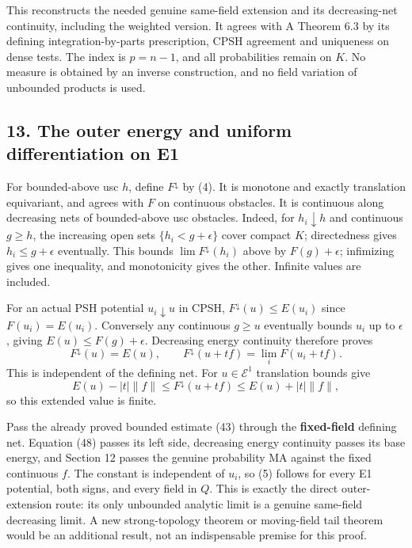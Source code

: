 \documentclass[
  10pt,
]{article}
\begin{document}
This reconstructs the needed genuine same-field extension and its
decreasing-net continuity, including the weighted version. It agrees
with A Theorem 6.3 by its defining integration-by-parts prescription,
CPSH agreement and uniqueness on dense tests. The index is \(p=n-1\),
and all probabilities remain on \(K\). No measure is obtained by an
inverse construction, and no field variation of unbounded products is
used.

\subsection{13. The outer energy and uniform differentiation on
E1}\label{the-outer-energy-and-uniform-differentiation-on-e1}

For bounded-above usc \(h\), define \(F^\downarrow\) by (4). It is
monotone and exactly translation equivariant, and agrees with \(F\) on
continuous obstacles. It is continuous along decreasing nets of
bounded-above usc obstacles. Indeed, for \(h_i\downarrow h\) and
continuous \(g\geq h\), the increasing open sets \(\{h_i<g+\epsilon\}\)
cover compact \(K\); directedness gives \(h_i\leq g+\epsilon\)
eventually. This bounds \(\lim F^\downarrow(h_i)\) above by
\(F(g)+\epsilon\); infimizing gives one inequality, and monotonicity
gives the other. Infinite values are included.

For an actual PSH potential \(u_i\downarrow u\) in CPSH,
\(F^\downarrow(u)\leq E(u_i)\) since \(F(u_i)=E(u_i)\). Conversely any
continuous \(g\geq u\) eventually bounds \(u_i\) up to \(\epsilon\),
giving \(E(u)\leq F(g)+\epsilon\). Decreasing energy continuity
therefore proves
\[ F^\downarrow(u)=E(u),\qquad F^\downarrow(u+tf)=\lim_iF(u_i+tf).                               \tag{48}\]
This is independent of the defining net. For \(u\in\mathcal E^1\)
translation bounds give
\[ E(u)-|t|\|f\|\leq F^\downarrow(u+tf)\leq E(u)+|t|\|f\|, \] so this
extended value is finite.

Pass the already proved bounded estimate (43) through the
\textbf{fixed-field} defining net. Equation (48) passes its left side,
decreasing energy continuity passes its base energy, and Section 12
passes the genuine probability MA against the fixed continuous \(f\).
The constant is independent of \(u_i\), so (5) follows for every E1
potential, both signs, and every field in \(Q\). This is exactly the
direct outer-extension route: its only unbounded analytic limit is a
genuine same-field decreasing limit. A new strong-topology theorem or
moving-field tail theorem would be an additional result, not an
indispensable premise for this proof.
\end{document}
